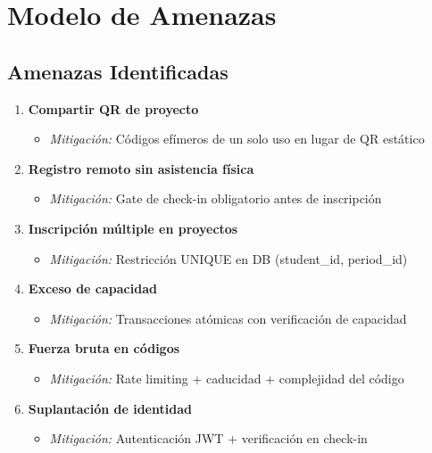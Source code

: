 \documentclass[12pt,a4paper]{article}
\begin{document}
\section{Modelo de Amenazas}

\subsection{Amenazas Identificadas}

\begin{enumerate}
    \item \textbf{Compartir QR de proyecto}
    \begin{itemize}
        \item \textit{Mitigación:} Códigos efímeros de un solo uso en lugar de QR estático
    \end{itemize}
    
    \item \textbf{Registro remoto sin asistencia física}
    \begin{itemize}
        \item \textit{Mitigación:} Gate de check-in obligatorio antes de inscripción
    \end{itemize}
    
    \item \textbf{Inscripción múltiple en proyectos}
    \begin{itemize}
        \item \textit{Mitigación:} Restricción UNIQUE en DB (student\_id, period\_id)
    \end{itemize}
    
    \item \textbf{Exceso de capacidad}
    \begin{itemize}
        \item \textit{Mitigación:} Transacciones atómicas con verificación de capacidad
    \end{itemize}
    
    \item \textbf{Fuerza bruta en códigos}
    \begin{itemize}
        \item \textit{Mitigación:} Rate limiting + caducidad + complejidad del código
    \end{itemize}
    
    \item \textbf{Suplantación de identidad}
    \begin{itemize}
        \item \textit{Mitigación:} Autenticación JWT + verificación en check-in
    \end{itemize}
    

\end{enumerate}
\end{document}
